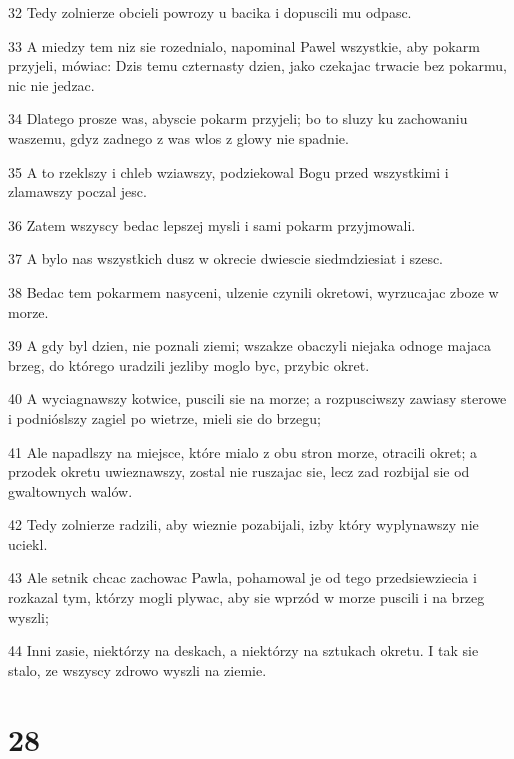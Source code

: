 \par 32 Tedy zolnierze obcieli powrozy u bacika i dopuscili mu odpasc.
\par 33 A miedzy tem niz sie rozednialo, napominal Pawel wszystkie, aby pokarm przyjeli, mówiac: Dzis temu czternasty dzien, jako czekajac trwacie bez pokarmu, nic nie jedzac.
\par 34 Dlatego prosze was, abyscie pokarm przyjeli; bo to sluzy ku zachowaniu waszemu, gdyz zadnego z was wlos z glowy nie spadnie.
\par 35 A to rzeklszy i chleb wziawszy, podziekowal Bogu przed wszystkimi i zlamawszy poczal jesc.
\par 36 Zatem wszyscy bedac lepszej mysli i sami pokarm przyjmowali.
\par 37 A bylo nas wszystkich dusz w okrecie dwiescie siedmdziesiat i szesc.
\par 38 Bedac tem pokarmem nasyceni, ulzenie czynili okretowi, wyrzucajac zboze w morze.
\par 39 A gdy byl dzien, nie poznali ziemi; wszakze obaczyli niejaka odnoge majaca brzeg, do którego uradzili jezliby moglo byc, przybic okret.
\par 40 A wyciagnawszy kotwice, puscili sie na morze; a rozpusciwszy zawiasy sterowe i podnióslszy zagiel po wietrze, mieli sie do brzegu;
\par 41 Ale napadlszy na miejsce, które mialo z obu stron morze, otracili okret; a przodek okretu uwieznawszy, zostal nie ruszajac sie, lecz zad rozbijal sie od gwaltownych walów.
\par 42 Tedy zolnierze radzili, aby wieznie pozabijali, izby który wyplynawszy nie uciekl.
\par 43 Ale setnik chcac zachowac Pawla, pohamowal je od tego przedsiewziecia i rozkazal tym, którzy mogli plywac, aby sie wprzód w morze puscili i na brzeg wyszli;
\par 44 Inni zasie, niektórzy na deskach, a niektórzy na sztukach okretu. I tak sie stalo, ze wszyscy zdrowo wyszli na ziemie.

\chapter{28}

